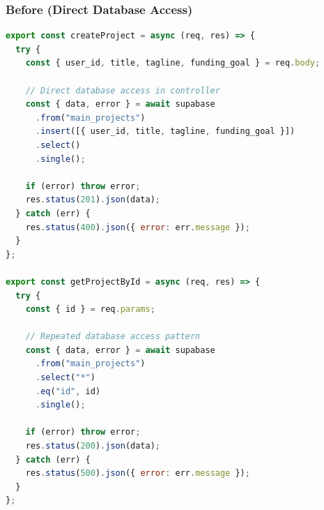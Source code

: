 \documentclass[12pt,a4paper]{article}
\begin{document}
\subsubsection{Before (Direct Database Access)}
\begin{lstlisting}[language=JavaScript, caption=Original projectController.js (excerpt)]
export const createProject = async (req, res) => {
  try {
    const { user_id, title, tagline, funding_goal } = req.body;
    
    // Direct database access in controller
    const { data, error } = await supabase
      .from("main_projects")
      .insert([{ user_id, title, tagline, funding_goal }])
      .select()
      .single();
      
    if (error) throw error;
    res.status(201).json(data);
  } catch (err) {
    res.status(400).json({ error: err.message });
  }
};

export const getProjectById = async (req, res) => {
  try {
    const { id } = req.params;
    
    // Repeated database access pattern
    const { data, error } = await supabase
      .from("main_projects")
      .select("*")
      .eq("id", id)
      .single();
      
    if (error) throw error;
    res.status(200).json(data);
  } catch (err) {
    res.status(500).json({ error: err.message });
  }
};
\end{lstlisting}
\end{document}
